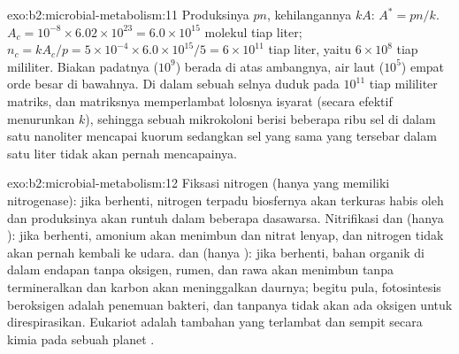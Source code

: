 \begin{solution}{exo:b2:microbial-metabolism:11}
Produksinya $pn$, kehilangannya $kA$: $A^* = pn/k$. $A_c = 10^{-8}\times
6.02\times 10^{23} = 6.0\times 10^{15}$ molekul tiap liter; $n_c =
kA_c/p = 5\times 10^{-4}\times 6.0\times 10^{15}/5 = 6\times 10^{11}$
tiap liter, yaitu $6\times 10^{8}$ tiap mililiter. Biakan padatnya
($10^{9}$) berada di atas ambangnya, air laut ($10^{5}$) empat orde
besar di bawahnya. Di dalam sebuah  selnya duduk pada $10^{11}$
tiap mililiter matriks, dan matriksnya memperlambat lolosnya isyarat
(secara efektif menurunkan $k$), sehingga sebuah mikrokoloni berisi
beberapa ribu sel di dalam satu nanoliter mencapai kuorum sedangkan
sel yang sama yang tersebar dalam satu liter tidak akan pernah mencapainya.
\end{solution}

\begin{solution}{exo:b2:microbial-metabolism:12}
Fiksasi nitrogen (hanya  yang memiliki nitrogenase): jika
berhenti, nitrogen terpadu biosfernya akan terkuras habis oleh
 dan produksinya akan runtuh dalam beberapa dasawarsa.
Nitrifikasi dan  (hanya ): jika berhenti,
amonium akan menimbun dan nitrat lenyap, dan nitrogen tidak akan pernah
kembali ke udara.  dan 
(hanya ): jika berhenti, bahan organik di dalam endapan tanpa
oksigen, rumen, dan rawa akan menimbun tanpa termineralkan dan karbon
akan meninggalkan daurnya; begitu pula, fotosintesis beroksigen adalah
penemuan bakteri, dan tanpanya tidak akan ada oksigen untuk
direspirasikan. Eukariot adalah tambahan yang terlambat dan sempit
secara kimia pada sebuah planet .
\end{solution}

